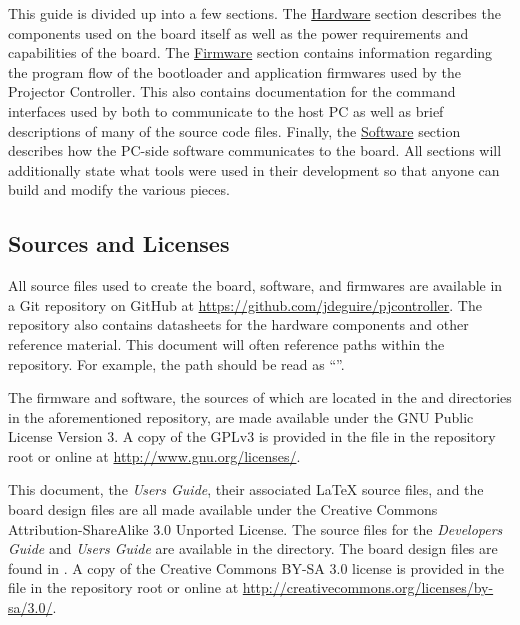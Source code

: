 \documentclass{article}
\begin{document}
This guide is divided up into a few sections.  The \hyperref[sec:Hardware]{Hardware} section
describes the components used on the board itself as well as the power requirements and capabilities
of the board.  The \hyperref[sec:Firmware]{Firmware} section contains information regarding the
program flow of the bootloader and application firmwares used by the Projector Controller.  This
also contains documentation for the command interfaces used by both to communicate to the host PC as
well as brief descriptions of many of the source code files.  Finally, the
\hyperref[sec:Software]{Software} section describes how the PC-side software communicates to the
board.  All sections will additionally state what tools were used in their development so that
anyone can build and modify the various pieces.

\subsection{Sources and Licenses} \label{ssec:SourceLic}
All source files used to create the board, software, and firmwares are available in a Git repository
on GitHub at \url{https://github.com/jdeguire/pjcontroller}.  The repository also contains
datasheets for the hardware components and other reference material.  This document will often
reference paths within the repository.  For example, the path  should
be read as ``''.

The firmware and software, the sources of which are located in the  and
 directories in the aforementioned repository, are made available under the GNU
Public License Version 3.  A copy of the GPLv3 is provided in the file  in the
repository root or online at \url{http://www.gnu.org/licenses/}.

This document, the \textit{Users Guide}, their associated \LaTeX{} source files, and the board
design files are all made available under the Creative Commons Attribution-ShareAlike 3.0 Unported
License.  The source files for the \textit{Developers Guide} and \textit{Users Guide} are available
in the  directory.  The board design files are found in
.  A copy of the Creative Commons BY-SA 3.0 license is provided in the
file  in the repository root or online at
\url{http://creativecommons.org/licenses/by-sa/3.0/}.
\end{document}
